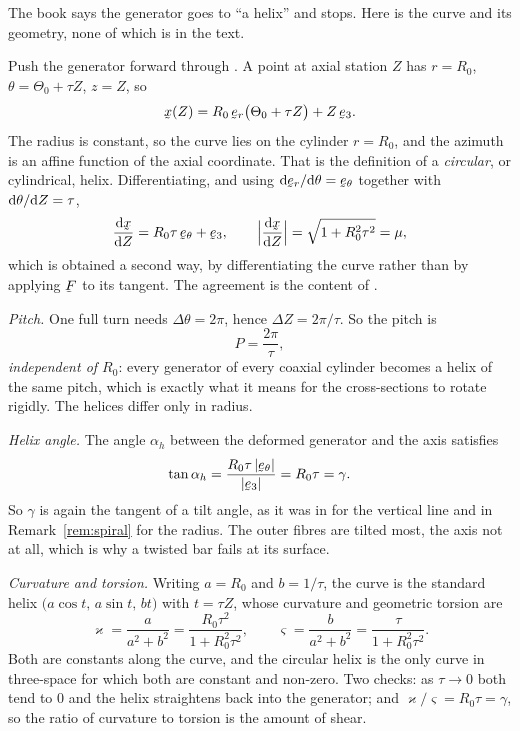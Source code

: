 \begin{remark}
\label{rem:helix}
The book says the generator goes to ``a helix'' and stops. Here is the
curve and its geometry, none of which is in the text.

Push the generator forward through . A point at axial station $Z$
has $r=R_{0}$, $\theta=\Theta_{0}+\tau Z$, $z=Z$, so
\[
   \bx(Z)=R_{0}\,\ber\big(\Theta_{0}+\tau Z\big)+Z\,\be_{3}.
\]
The radius is constant, so the curve lies on the cylinder $r=R_{0}$, and
the azimuth is an affine function of the axial coordinate. That is the
definition of a \emph{circular}, or cylindrical, helix. Differentiating,
and using $\dl\ber/\dl\theta=\bet$ together with $\mathrm{d}\theta/\mathrm{d} Z=\tau$,
\[
   \frac{\dl\bx}{\dl Z}=R_{0}\tau\,\bet+\be_{3},
   \qquad
   \Big|\frac{\dl\bx}{\dl Z}\Big|=\sqrt{1+R_{0}^{2}\tau^{2}}=\mu ,
\]
which is  obtained a second way, by differentiating the curve
rather than by applying $\bF$ to its tangent. The agreement is the content
of .

\emph{Pitch.} One full turn needs $\Delta\theta=2\pi$, hence
$\Delta Z=2\pi/\tau$. So the pitch is
\[
   P=\frac{2\pi}{\tau},
\]
\emph{independent of $R_{0}$}: every generator of every coaxial cylinder
becomes a helix of the same pitch, which is exactly what it means for the
cross-sections to rotate rigidly. The helices differ only in radius.

\emph{Helix angle.} The angle $\alpha_{h}$ between the deformed generator
and the axis satisfies
\[
   \tan\alpha_{h}=\frac{R_{0}\tau\,|\bet|}{|\be_{3}|}=R_{0}\tau=\gamma .
\]
So $\gamma$ is again the tangent of a tilt angle, as it was in 
for the vertical line and in Remark~\ref{rem:spiral} for the radius. The
outer fibres are tilted most, the axis not at all, which is why a twisted
bar fails at its surface.

\emph{Curvature and torsion.} Writing $a=R_{0}$ and $b=1/\tau$, the curve
is the standard helix $\big(a\cos t,\,a\sin t,\,bt\big)$ with $t=\tau Z$,
whose curvature and geometric torsion are
\[
   \varkappa=\frac{a}{a^{2}+b^{2}}=\frac{R_{0}\tau^{2}}{1+R_{0}^{2}\tau^{2}},
   \qquad
   \varsigma=\frac{b}{a^{2}+b^{2}}=\frac{\tau}{1+R_{0}^{2}\tau^{2}} .
\]
Both are constants along the curve, and the circular helix is the only
curve in three-space for which both are constant and non-zero. Two checks:
as $\tau\to0$ both tend to $0$ and the helix straightens back into the
generator; and $\varkappa/\varsigma=R_{0}\tau=\gamma$, so the ratio of
curvature to torsion is the amount of shear.
\end{remark}

